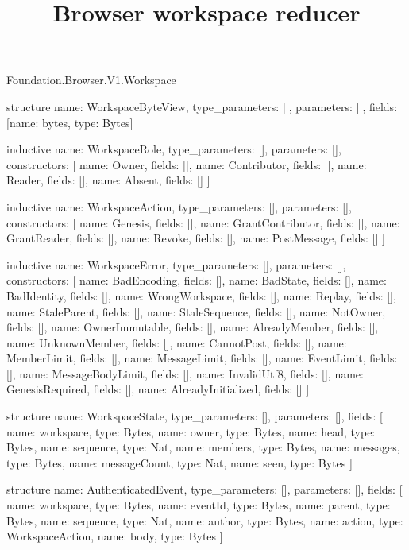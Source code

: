 \begin{lexlean}{Foundation.Browser.V1.Workspace}
\title{Browser workspace reducer}
\begin{semanticmodule}
structure{
  name: WorkspaceByteView,
  type_parameters: [],
  parameters: [],
  fields: [{name: bytes, type: Bytes}]
}

inductive{
  name: WorkspaceRole,
  type_parameters: [],
  parameters: [],
  constructors: [
    {name: Owner, fields: []},
    {name: Contributor, fields: []},
    {name: Reader, fields: []},
    {name: Absent, fields: []}
  ]
}

inductive{
  name: WorkspaceAction,
  type_parameters: [],
  parameters: [],
  constructors: [
    {name: Genesis, fields: []},
    {name: GrantContributor, fields: []},
    {name: GrantReader, fields: []},
    {name: Revoke, fields: []},
    {name: PostMessage, fields: []}
  ]
}

inductive{
  name: WorkspaceError,
  type_parameters: [],
  parameters: [],
  constructors: [
    {name: BadEncoding, fields: []},
    {name: BadState, fields: []},
    {name: BadIdentity, fields: []},
    {name: WrongWorkspace, fields: []},
    {name: Replay, fields: []},
    {name: StaleParent, fields: []},
    {name: StaleSequence, fields: []},
    {name: NotOwner, fields: []},
    {name: OwnerImmutable, fields: []},
    {name: AlreadyMember, fields: []},
    {name: UnknownMember, fields: []},
    {name: CannotPost, fields: []},
    {name: MemberLimit, fields: []},
    {name: MessageLimit, fields: []},
    {name: EventLimit, fields: []},
    {name: MessageBodyLimit, fields: []},
    {name: InvalidUtf8, fields: []},
    {name: GenesisRequired, fields: []},
    {name: AlreadyInitialized, fields: []}
  ]
}

structure{
  name: WorkspaceState,
  type_parameters: [],
  parameters: [],
  fields: [
    {name: workspace, type: Bytes},
    {name: owner, type: Bytes},
    {name: head, type: Bytes},
    {name: sequence, type: Nat},
    {name: members, type: Bytes},
    {name: messages, type: Bytes},
    {name: messageCount, type: Nat},
    {name: seen, type: Bytes}
  ]
}

structure{
  name: AuthenticatedEvent,
  type_parameters: [],
  parameters: [],
  fields: [
    {name: workspace, type: Bytes},
    {name: eventId, type: Bytes},
    {name: parent, type: Bytes},
    {name: sequence, type: Nat},
    {name: author, type: Bytes},
    {name: action, type: WorkspaceAction},
    {name: body, type: Bytes}
  ]
}


\end{semanticmodule}
\end{lexlean}
